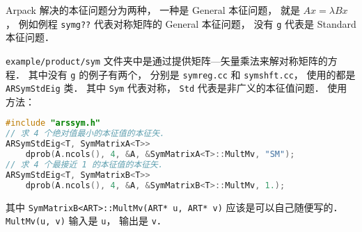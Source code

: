 Arpack 解决的本征问题分为两种， 一种是 General 本征问题， 就是 $Ax = \lambda Bx$， 例如例程 \verb|symg??| 代表对称矩阵的 General 本征问题， 没有 \verb|g| 代表是 Standard 本征问题．

\verb|example/product/sym| 文件夹中是通过提供矩阵—矢量乘法来解对称矩阵的方程． 其中没有 \verb|g| 的例子有两个， 分别是 \verb|symreg.cc| 和 \verb|symshft.cc|， 使用的都是 \verb|ARSymStdEig| 类． 其中 \verb|Sym| 代表对称， \verb|Std| 代表是非广义的本征值问题． 使用方法：
\begin{lstlisting}[language=cpp]
#include "arssym.h"
// 求 4 个绝对值最小的本征值的本征矢．
ARSymStdEig<T, SymMatrixA<T>>
    dprob(A.ncols(), 4, &A, &SymMatrixA<T>::MultMv, "SM");
// 求 4 个最接近 1 的本征值的本征矢．
ARSymStdEig<T, SymMatrixB<T>>
    dprob(A.ncols(), 4, &A, &SymMatrixB<T>::MultMv, 1.);
\end{lstlisting}
其中 \verb|SymMatrixB<ART>::MultMv(ART* u, ART* v)| 应该是可以自己随便写的． \verb|MultMv(u, v)| 输入是 \verb|u|， 输出是 \verb|v|．
